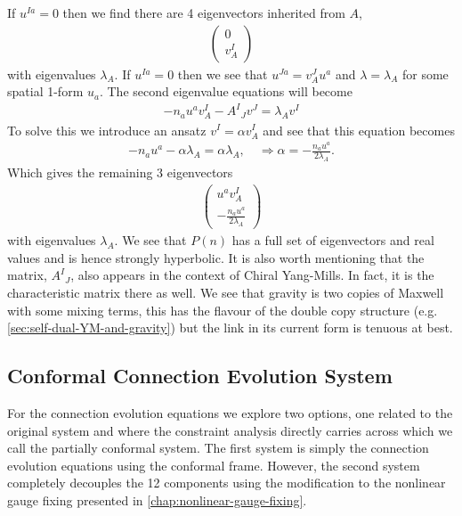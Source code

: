 \documentclass[10pt]{report}
\theoremstyle{definition}
\begin{document}
    If $u^{Ia} = 0$ then we find there are 4 eigenvectors inherited from $A$,
    \begin{align}
        \begin{pmatrix}
            0 \\ v_A^I
        \end{pmatrix}
    \end{align}
    with eigenvalues $\lambda_A$. If $u^{Ia} = 0$ then we see that $u^{Ja} = v_A^J u^a$ and $\lambda = \lambda_A$ for some spatial 1-form $u_a$. The second eigenvalue equations will become
    \begin{align}
        -n_a u^a v_A^I - A^I{}_J v^J = \lambda_A v^I
    \end{align}
    To solve this we introduce an ansatz $v^I = \alpha v_A^I$ and see that this equation becomes 
    \begin{align}
        -n_a u^a - \alpha \lambda_A = \alpha \lambda_A, \quad \Rightarrow \alpha = -\frac{n_a u^a}{2 \lambda_A}.
    \end{align}
    Which gives the remaining 3 eigenvectors 
    \begin{align}
        \begin{pmatrix}
            u^a v_A^I \\ -\frac{n_a u^a}{2\lambda_A}
        \end{pmatrix}
    \end{align}
    with eigenvalues $\lambda_A$. We see that $P(n)$ has a full set of eigenvectors and real values and is hence strongly hyperbolic. It is also worth mentioning that the matrix, $A^I{}_J$, also appears in the context of Chiral Yang-Mills. In fact, it is the characteristic matrix there as well. We see that gravity is two copies of Maxwell with some mixing terms, this has the flavour of the double copy structure (e.g. \cref{sec:self-dual-YM-and-gravity}) but the link in its current form is tenuous at best.

    \subsection{Conformal Connection Evolution System}
        For the connection evolution equations we explore two options, one related to the original system and where the constraint analysis directly carries across which we call the partially conformal system. The first system is simply the connection evolution equations using the conformal frame. However, the second system completely decouples the 12 components using the modification to the nonlinear gauge fixing presented in \cref{chap:nonlinear-gauge-fixing}.
\end{document}
